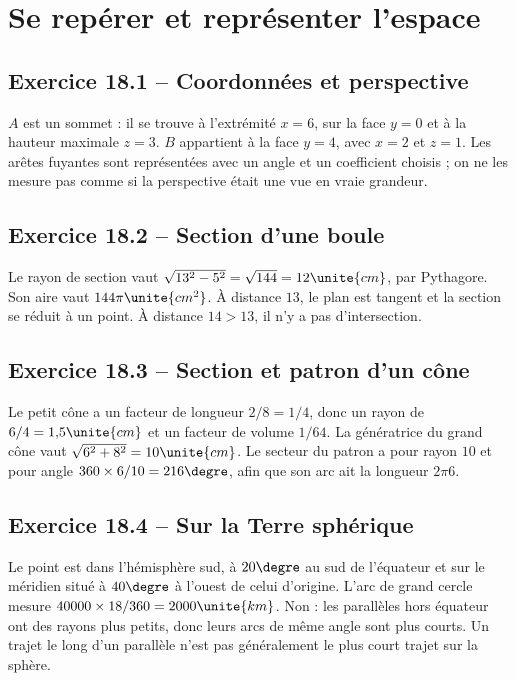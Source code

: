\chapter{Se repérer et représenter l'espace}
\label{corriges:18}
\section*{Exercice 18.1 -- Coordonnées et perspective}
$A$ est un sommet : il se trouve à l'extrémité $x=6$, sur la face $y=0$ et à la hauteur maximale $z=3$. $B$ appartient à la face $y=4$, avec $x=2$ et $z=1$. Les arêtes fuyantes sont représentées avec un angle et un coefficient choisis ; on ne les mesure pas comme si la perspective était une vue en vraie grandeur.

\section*{Exercice 18.2 -- Section d'une boule}
Le rayon de section vaut $\sqrt{13^2-5^2}=\sqrt{144}=12\unite{cm}$, par Pythagore. Son aire vaut $144\pi\unite{cm^2}$. À distance $13$, le plan est tangent et la section se réduit à un point. À distance $14>13$, il n'y a pas d'intersection.

\section*{Exercice 18.3 -- Section et patron d'un cône}
Le petit cône a un facteur de longueur $2/8=1/4$, donc un rayon de $6/4=1{,}5\unite{cm}$ et un facteur de volume $1/64$.
La génératrice du grand cône vaut $\sqrt{6^2+8^2}=10\unite{cm}$. Le secteur du patron a pour rayon $10$ et pour angle $360\times6/10=216\degre$, afin que son arc ait la longueur $2\pi6$.

\section*{Exercice 18.4 -- Sur la Terre sphérique}
Le point est dans l'hémisphère sud, à $20\degre$ au sud de l'équateur et sur le méridien situé à $40\degre$ à l'ouest de celui d'origine. L'arc de grand cercle mesure $40000\times18/360=2000\unite{km}$. Non : les parallèles hors équateur ont des rayons plus petits, donc leurs arcs de même angle sont plus courts. Un trajet le long d'un parallèle n'est pas généralement le plus court trajet sur la sphère.
